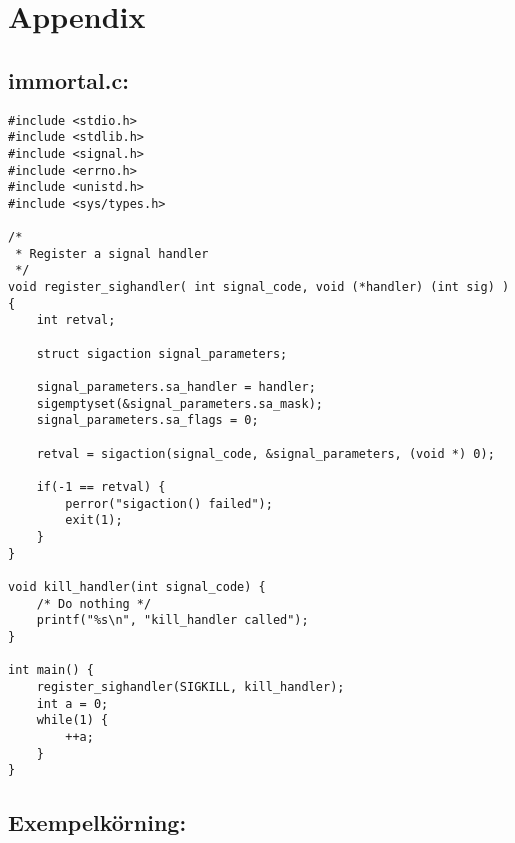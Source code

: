 \documentclass[paper=a4, fontsize=11pt]{scrartcl} %
\numberwithin{equation}{section} %
\numberwithin{figure}{section} %
\numberwithin{table}{section} %
\begin{document}

\newpage
\section*{Appendix}
\subsection*{immortal.c:}

\begin{verbatim}
#include <stdio.h>
#include <stdlib.h>
#include <signal.h>
#include <errno.h>
#include <unistd.h>
#include <sys/types.h>

/*
 * Register a signal handler
 */
void register_sighandler( int signal_code, void (*handler) (int sig) )  {
    int retval;

    struct sigaction signal_parameters;

    signal_parameters.sa_handler = handler;
    sigemptyset(&signal_parameters.sa_mask);
    signal_parameters.sa_flags = 0;

    retval = sigaction(signal_code, &signal_parameters, (void *) 0);

    if(-1 == retval) {
        perror("sigaction() failed");
        exit(1);
    }
}

void kill_handler(int signal_code) {
    /* Do nothing */
    printf("%s\n", "kill_handler called");
}

int main() {
    register_sighandler(SIGKILL, kill_handler);
    int a = 0;
    while(1) {
        ++a;
    }
}
\end{verbatim}
\newpage


\subsection*{Exempelkörning:}
\end{document}

